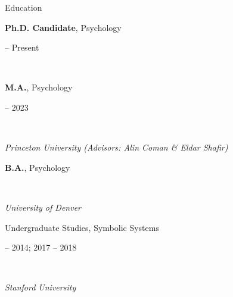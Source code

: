 \documentclass{cv} %
\begin{document}
\nocite{*}


\begin{cvSection}{Education}

\begin{minipage}[t]{0.80\linewidth}
    \raggedright \textbf{Ph.D. Candidate}, Psychology%
\end{minipage}
\hfill
\begin{minipage}[t]{0.15\linewidth}
     -- Present%
\end{minipage}
\\
\begin{minipage}[t]{0.50\linewidth}
    \raggedright \textbf{M.A.}, Psychology%
\end{minipage}
\hfill
\begin{minipage}[t]{0.45\linewidth}
     -- 2023
\end{minipage}
\\
\begin{minipage}[t]{0.80\linewidth}
    \raggedright \textit{Princeton University (Advisors: Alin Coman \& Eldar Shafir)}%
\end{minipage}
\hfill
\begin{minipage}[t]{0.15\linewidth}
%
\end{minipage}


\begin{minipage}[t]{0.50\linewidth}
    \raggedright \textbf{B.A.}, Psychology%
\end{minipage}
\hfill
\begin{minipage}[t]{0.45\linewidth}
\end{minipage}
\\
\begin{minipage}[t]{0.50\linewidth}
    \raggedright \textit{University of Denver}%
\end{minipage}
\hfill
\begin{minipage}[t]{0.45\linewidth}
\end{minipage}

\begin{minipage}[t]{0.50\linewidth}
    \raggedright Undergraduate Studies, Symbolic Systems%
\end{minipage}
\hfill
\begin{minipage}[t]{0.45\linewidth}
     -- 2014; 2017 -- 2018%
\end{minipage}
\\
\begin{minipage}[t]{0.50\linewidth}
    \raggedright \textit{Stanford University}%
\end{minipage}
\hfill
\begin{minipage}[t]{0.45\linewidth}
\end{minipage}

\end{cvSection}
\end{document}

